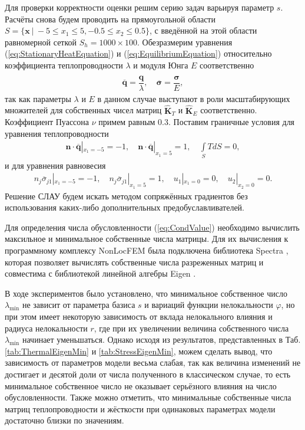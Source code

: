 Для проверки корректности оценки решим серию задач варьируя параметр $s$. Расчёты снова будем проводить на прямоугольной области $S = \{ \boldsymbol{x} \ | \ -5 \leqslant x_1 \leqslant 5, -0.5 \leqslant x_2 \leqslant 0.5  \}$, с введённой на этой области равномерной сеткой $S_h = 1000 \times 100$. Обезразмерим уравнения (\ref{eq:StationaryHeatEquation}) и (\ref{eq:EquilibriumEquation}) относительно коэффициента теплопроводности $\lambda$ и модуля Юнга $E$ соответственно
\begin{gather*}
	\overline{\boldsymbol{q}} = \dfrac{\boldsymbol{q}}{\lambda},
	\quad
	\overline{\boldsymbol{\sigma}} = \dfrac{\widehat{\boldsymbol{\sigma}}}{E},
\end{gather*}
так как параметры $\lambda$ и $E$ в данном случае выступают в роли масштабирующих множителей для собственных чисел матриц $\widehat{\textbf{K}}_T$ и $\widehat{\textbf{K}}_E$ соответственно. Коэффициент Пуассона $\nu$ примем равным 0.3. Поставим граничные условия для уравнения теплопроводности
\begin{gather*}
	\boldsymbol{n} \cdot \overline{\boldsymbol{q}} |_{x_1 = -5} = -1,
	\quad
	\boldsymbol{n} \cdot \overline{\boldsymbol{q}} |_{x_1 = 5} = 1,
	\quad
	\int\limits_S T dS = 0,
\end{gather*}
и для уравнения равновесия
\begin{gather*}
	n_j \overline{\sigma}_{j1} |_{x_1 = -5} = -1,
	\quad
	n_j \overline{\sigma}_{j1} |_{x_1 = 5} = 1,
	\quad
	u_1 |_{x_1 = 0} = 0,
	\quad
	u_2 |_{x_2 = 0} = 0.
\end{gather*}
Решение СЛАУ будем искать методом сопряжённых градиентов без использования каких-либо дополнительных предобуславливателей.

Для определения числа обусловленности (\ref{eq:CondValue}) необходимо вычислить максильное и минимальное собственные числа матрицы. Для их вычисления к программному комплексу NonLocFEM была подключена библиотека Spectra \cite{SpectraLib}, которая позволяет вычислять собственные числа разреженных матриц и совместима с библиотекой линейной алгебры Eigen \cite{EigenLib}.

В ходе экспериментов было установлено, что минимальное собственное число $\lambda_{\min}$ не зависит от параметра базиса $s$ и вариаций функции нелокальности $\varphi$, но при этом имеет некоторую зависимость от вклада нелокального влияния и радиуса нелокальности $r$, где при их увеличении величина собственного числа $\lambda_{\min}$ начинает уменьшаться. Однако исходя из результатов, представленных в Таб. \ref{tab:ThermalEigenMin} и \ref{tab:StressEigenMin}, можем сделать вывод, что зависимость от параметров модели весьма слабая, так как величина изменений не достигает и десятой доли от числа полученного в классическом случае, то есть минимальное собственное число не оказывает серьёзного влияния на число обусловленности. Также можно отметить, что минимальные собственные числа матриц теплопроводности и жёсткости при одинаковых параметрах модели достаточно близки по значениям.

